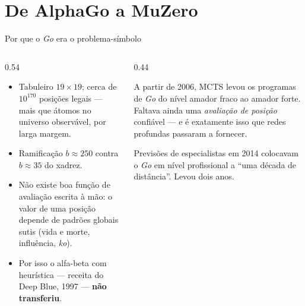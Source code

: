 \documentclass[aspectratio=169, 11pt]{beamer}
\begin{document}
\section{De AlphaGo a MuZero}

\begin{frame}{Por que o \emph{Go} era o problema-símbolo}
  \begin{columns}[T]
    \begin{column}{0.54\textwidth}
      \begin{itemize}
        \item Tabuleiro $19\times19$; cerca de $10^{170}$ posições legais ---
              mais que átomos no universo observável, por larga margem.
        \item Ramificação $b\approx 250$ contra $b\approx 35$ do xadrez.
        \item Não existe boa função de avaliação escrita à mão: o valor de uma
              posição depende de padrões globais sutis (vida e morte, influência,
              \emph{ko}).
        \item Por isso o alfa-beta com heurística --- receita do Deep Blue,
              1997 --- \textbf{não transferiu}.
      \end{itemize}
    \end{column}
    \begin{column}{0.44\textwidth}
      \begin{ideiabox}
        A partir de 2006, MCTS levou os programas de \emph{Go} do nível
        amador fraco ao amador forte. Faltava ainda uma \emph{avaliação de
        posição} confiável --- e é exatamente isso que redes profundas
        passaram a fornecer.
      \end{ideiabox}
      \begin{alertabox}
        Previsões de especialistas em 2014 colocavam o \emph{Go} em nível
        profissional a ``uma década de distância''. Levou dois anos.
      \end{alertabox}
    \end{column}
  \end{columns}
\end{frame}
\end{document}

